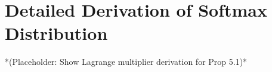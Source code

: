 \documentclass{article}
\begin{document}
\section{Detailed Derivation of Softmax Distribution}
*(Placeholder: Show Lagrange multiplier derivation for Prop 5.1)*

\end{document}
